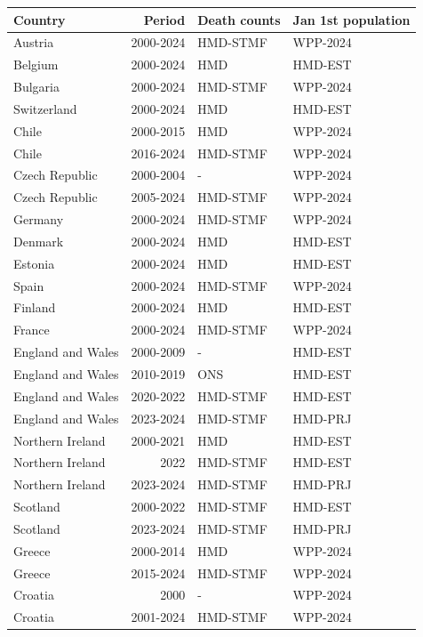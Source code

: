 \begin{table}[t]
\fontsize{12.0pt}{14.0pt}\selectfont
\begin{tabular*}{\linewidth}{@{\extracolsep{\fill}}lrll}
\toprule
Country & Period & Death counts & Jan 1st population \\ 
\midrule\addlinespace[2.5pt]
Austria & 2000-2024 & HMD-STMF & WPP-2024 \\ 
Belgium & 2000-2024 & HMD & HMD-EST \\ 
Bulgaria & 2000-2024 & HMD-STMF & WPP-2024 \\ 
Switzerland & 2000-2024 & HMD & HMD-EST \\ 
Chile & 2000-2015 & HMD & WPP-2024 \\ 
Chile & 2016-2024 & HMD-STMF & WPP-2024 \\ 
Czech Republic & 2000-2004 & - & WPP-2024 \\ 
Czech Republic & 2005-2024 & HMD-STMF & WPP-2024 \\ 
Germany & 2000-2024 & HMD-STMF & WPP-2024 \\ 
Denmark & 2000-2024 & HMD & HMD-EST \\ 
Estonia & 2000-2024 & HMD & HMD-EST \\ 
Spain & 2000-2024 & HMD-STMF & WPP-2024 \\ 
Finland & 2000-2024 & HMD & HMD-EST \\ 
France & 2000-2024 & HMD-STMF & WPP-2024 \\ 
England and Wales & 2000-2009 & - & HMD-EST \\ 
England and Wales & 2010-2019 & ONS & HMD-EST \\ 
England and Wales & 2020-2022 & HMD-STMF & HMD-EST \\ 
England and Wales & 2023-2024 & HMD-STMF & HMD-PRJ \\ 
Northern Ireland & 2000-2021 & HMD & HMD-EST \\ 
Northern Ireland & 2022 & HMD-STMF & HMD-EST \\ 
Northern Ireland & 2023-2024 & HMD-STMF & HMD-PRJ \\ 
Scotland & 2000-2022 & HMD-STMF & HMD-EST \\ 
Scotland & 2023-2024 & HMD-STMF & HMD-PRJ \\ 
Greece & 2000-2014 & HMD & WPP-2024 \\ 
Greece & 2015-2024 & HMD-STMF & WPP-2024 \\ 
Croatia & 2000 & - & WPP-2024 \\ 
Croatia & 2001-2024 & HMD-STMF & WPP-2024 \\ 

\end{tabular*}
\end{table}

